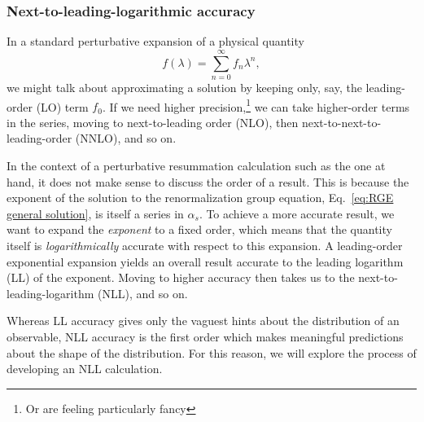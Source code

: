 \documentclass[12pt,twoside,class=../reedthesis, crop=false]{standalone}
\begin{document}
\subsubsection{Next-to-leading-logarithmic accuracy}
	In a standard perturbative expansion of a physical quantity
	\begin{equation}
		f(\lambda) = \sum_{n = 0}^\infty f_n \lambda^n,
	\end{equation}
	we might talk about approximating a solution by keeping only, say, the leading-order (LO) term $f_0$. If we need higher precision,\footnote{Or are feeling particularly fancy} we can take higher-order terms in the series, moving to next-to-leading order (NLO), then next-to-next-to-leading-order (NNLO), and so on.

	In the context of a perturbative resummation calculation such as the one at hand, it does not make sense to discuss the order of a result. This is because the exponent of the solution to the renormalization group equation, Eq.~\ref{eq:RGE general solution}, is itself a series in $\alpha_s$. To achieve a more accurate result, we want to expand the \textit{exponent} to a fixed order, which means that the quantity itself is \textit{logarithmically} accurate with respect to this expansion. A leading-order exponential expansion yields an overall result accurate to the leading logarithm (LL) of the exponent. Moving to higher accuracy then takes us to the next-to-leading-logarithm (NLL), and so on.

	Whereas LL accuracy gives only the vaguest hints about the distribution of an observable, NLL accuracy is the first order which makes meaningful predictions about the shape of the distribution. For this reason, we will explore the process of developing an NLL calculation.
\end{document}
